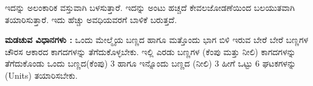 ಇದನ್ನು ಅಲಂಕಾರಿಕ ವಸ್ತುವಾಗಿ ಬಳಸುತ್ತಾರೆ. ಇದನ್ನು ಅಂಟು ಹಚ್ಚದೆ ಕೇವಲ\break ಜೋಡಣೆಯಿಂದ ಬಲಯುತವಾಗಿ ತಯಾರಿಸುತ್ತಾರೆ. ಇದು ಹೆಚ್ಚು ಅವಧಿಯವರಗೆ ಬಾಳಿಕೆ ಬರುತ್ತದೆ.
\begin{figure}[H]
\end{figure}

\noindent
\textbf{ಮಡಚುವ ವಿಧಾನಗಳು :} ಒಂದು ಮೇಲ್ಮೈಯ ಬಣ್ಣದ ಹಾಗೂ ಮತ್ತೊಂದು ಭಾಗ ಬಿಳಿ ಇರುವ ಬೇರೆ ಬೇರೆ ಬಣ್ಣಗಳ ಚೌರಸ ಆಕಾರದ ಕಾಗದಗಳನ್ನು ತೆಗೆದುಕೊಳ್ಳಬೇಕು. ಇಲ್ಲಿ ಎರಡು ಬಣ್ಣಗಳ (ಕೆಂಪು ಮತ್ತು ನೀಲಿ) ಕಾಗದಗಳನ್ನು ತೆಗೆದುಕೊಂಡು ಒಂದು ಬಣ್ಣದ\break (ಕೆಂಪು) 3 ಹಾಗೂ ಇನ್ನೊಂದು ಬಣ್ಣದ (ನೀಲಿ) 3 ಹೀಗೆ ಒಟ್ಟು 6 ಘಟಕಗಳನ್ನು (Units) ತಯಾರಿಸಬೇಕು.


